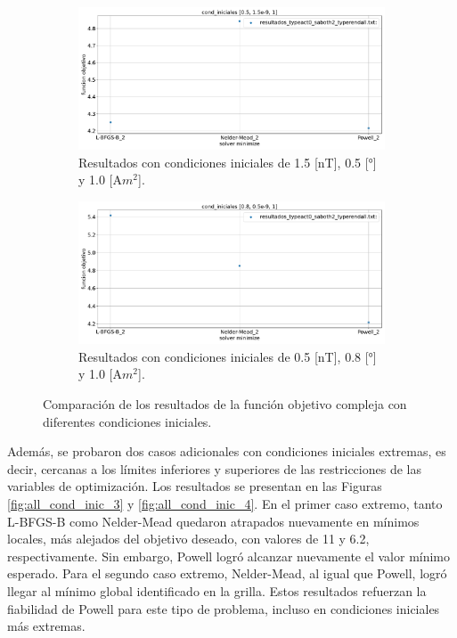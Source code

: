 \begin{figure}[h!]
	\centering
	\begin{subfigure}[b]{0.8\textwidth}
		\centering
		\includegraphics[width=\textwidth]{cond_iniciales_0.5_1.5e-9_1.0.pdf}
		\caption{Resultados con condiciones iniciales de 1.5 [nT], 0.5 [°] y 1.0 [A$m^2$].}
		\label{fig:all_cond_inic_1}
	\end{subfigure}
	\hfill
	\begin{subfigure}[b]{0.8\textwidth}
		\centering
		\includegraphics[width=\textwidth]{cond_iniciales_0.8_0.5e-9_1.0.pdf}
		\caption{Resultados con condiciones iniciales de 0.5 [nT], 0.8 [°] y 1.0 [A$m^2$].}
		\label{fig:all_cond_inic_2}
	\end{subfigure}
	\caption{Comparación de los resultados de la función objetivo compleja con diferentes condiciones iniciales.}
	\label{fig:cond_iniciales_comparacion}
\end{figure}

Además, se probaron dos casos adicionales con condiciones iniciales extremas, es decir, cercanas a los límites inferiores y superiores de las restricciones de las variables de optimización. Los resultados se presentan en las Figuras \ref{fig:all_cond_inic_3} y \ref{fig:all_cond_inic_4}. En el primer caso extremo, tanto L-BFGS-B como Nelder-Mead quedaron atrapados nuevamente en mínimos locales, más alejados del objetivo deseado, con valores de 11 y 6.2, respectivamente. Sin embargo, Powell logró alcanzar nuevamente el valor mínimo esperado. Para el segundo caso extremo, Nelder-Mead, al igual que Powell, logró llegar al mínimo global identificado en la grilla. Estos resultados refuerzan la fiabilidad de Powell para este tipo de problema, incluso en condiciones iniciales más extremas.


